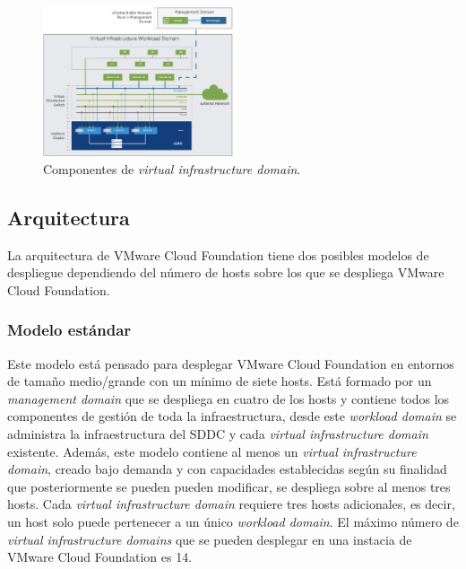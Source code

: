 \begin{figure}[h!]
  \centering
  \includegraphics[width=0.5\textwidth]{imaxes/conceptosPrevios/networkArcVIDomain.png}
  \caption{Componentes de \textit{virtual infrastructure domain}.}
  \label{fig:compoVIdomain}
\end{figure}
\FloatBarrier




\subsection{Arquitectura}
La arquitectura de VMware Cloud Foundation tiene dos posibles modelos de despliegue dependiendo del número de hosts sobre los que se despliega VMware Cloud Foundation.

\subsubsection{Modelo estándar}
Este modelo está pensado para desplegar VMware Cloud Foundation en entornos de tamaño medio/grande con un mínimo de siete hosts. Está formado por un \textit{management domain} que se despliega en cuatro de los hosts y contiene todos los componentes de gestión de toda la infraestructura, desde este \textit{workload domain} se administra la infraestructura del SDDC y cada \textit{virtual infrastructure domain} existente. Además, este modelo contiene al menos un \textit{virtual infrastructure domain}, creado bajo demanda y con capacidades establecidas según su finalidad que posteriormente se pueden pueden modificar, se despliega sobre al menos tres hosts. Cada \textit{virtual infrastructure domain} requiere tres hosts adicionales, es decir, un host solo puede pertenecer a un único \textit{workload domain}. El máximo número de \textit{virtual infrastructure domains} que se pueden desplegar en una instacia de VMware Cloud Foundation es 14.


